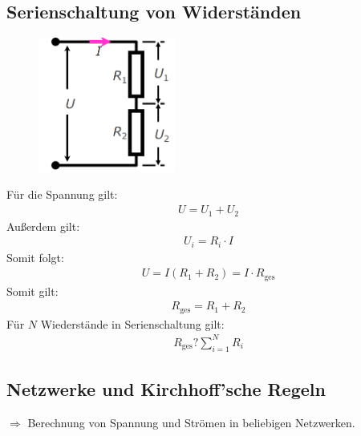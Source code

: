 \documentclass{article}
\begin{document}
\subsection{Serienschaltung von Widerständen}
\begin{figure}[H]
    \centering
    \includegraphics[width=0.4\textwidth]{serienschaltung.png}
\end{figure}
Für die Spannung gilt:
\begin{align}
    U=U_1+U_2
\end{align}
Außerdem gilt:
\begin{align}
    U_i=R_i\cdot I
\end{align}
Somit folgt:
\begin{align}
    U=I(R_1+R_2)=I\cdot R_\text{ges}
\end{align}
Somit gilt:
\begin{align}
    R_\text{ges}=R_1+R_2
\end{align}
Für $N$ Wiederstände in Serienschaltung gilt:
\begin{align}
    R_\text{ges}?\sum_{i=1}^{N}R_i
\end{align}

\subsection{Netzwerke und Kirchhoff'sche Regeln}
$\Rightarrow$ Berechnung von Spannung und Strömen in beliebigen Netzwerken.
\end{document}
